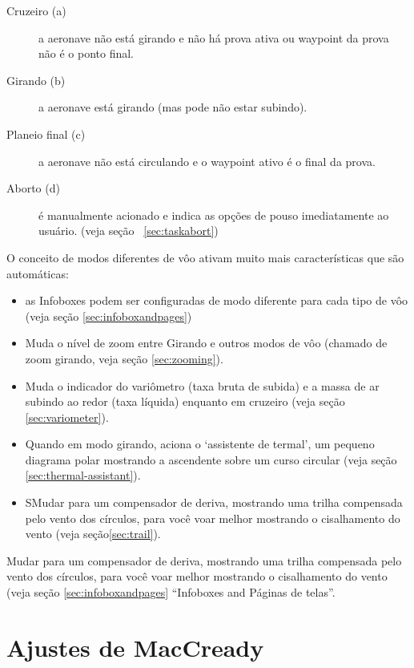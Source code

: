 \begin{description}
\item[Cruzeiro (a)]   a aeronave não está girando e não há prova ativa ou waypoint da prova não é o ponto final.
\item[Girando (b)]  a aeronave está girando (mas pode não estar subindo).
\item[Planeio final (c)]  a aeronave não está circulando e o waypoint ativo é o final da prova.

\item[Aborto (d)]  é manualmente acionado e indica as opções de pouso imediatamente ao usuário. (veja seção ~\ref{sec:taskabort})
\end{description}

O conceito de modos diferentes de vôo ativam muito mais características que são automáticas:
\begin{itemize}
\item {} as Infoboxes podem ser configuradas de modo diferente para cada tipo de vôo (veja seção \ref{sec:infoboxandpages})
\item {} Muda o nível de zoom entre Girando e outros modos de vôo (chamado de zoom girando, veja seção \ref{sec:zooming}).
\item {} Muda o indicador do variômetro (taxa bruta de subida) e a massa de ar subindo ao redor (taxa líquida) enquanto em cruzeiro (veja seção \ref{sec:variometer}).
\item {} Quando em modo girando, aciona o ‘assistente de termal’, um pequeno diagrama polar mostrando a ascendente sobre um curso circular  (veja seção \ref{sec:thermal-assistant}).
\item {} SMudar para um compensador de deriva, mostrando uma trilha compensada pelo vento dos círculos, para você voar melhor mostrando o cisalhamento do vento (veja seção\ref{sec:trail}). 
\end{itemize}

Mudar para um compensador de deriva, mostrando uma trilha compensada pelo vento dos círculos, para você voar melhor mostrando o cisalhamento do vento (veja seção
\ref{sec:infoboxandpages} “Infoboxes and Páginas de telas”.


\section{Ajustes de MacCready}

